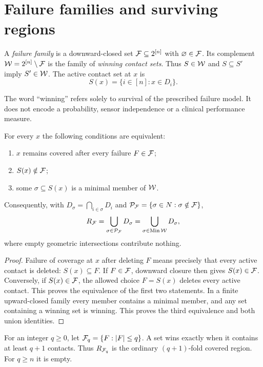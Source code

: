 \section{Failure families and surviving regions}
\label{sec:failures}
\begin{definition}
A \emph{failure family} is a downward-closed set $\mathcal F\subseteq2^{[n]}$ with $\varnothing\in\mathcal F$. Its complement $\mathcal W=2^{[n]}\setminus\mathcal F$ is the family of \emph{winning contact sets}. Thus $S\in\mathcal W$ and $S\subseteq S'$ imply $S'\in\mathcal W$. The active contact set at $x$ is
\[
S(x)=\{i\in[n]:x\in D_i\}.
\]
\end{definition}
The word ``winning'' refers solely to survival of the prescribed failure model. It does not encode a probability, sensor independence or a clinical performance measure.

\begin{proposition}\label{prop:pointwise}
For every $x$ the following conditions are equivalent:
\begin{enumerate}
\item $x$ remains covered after every failure $F\in\mathcal F$;
\item $S(x)\notin\mathcal F$;
\item some $\sigma\subseteq S(x)$ is a minimal member of $\mathcal W$.
\end{enumerate}
Consequently, with $D_\sigma=\bigcap_{i\in\sigma}D_i$ and $\mathcal P_{\mathcal F}=\{\sigma\in N:\sigma\notin\mathcal F\}$,
\begin{equation}\label{eq:region-unions}
R_{\mathcal F}=\bigcup_{\sigma\in\mathcal P_{\mathcal F}}D_\sigma
=\bigcup_{\sigma\in\operatorname{Min}\mathcal W}D_\sigma,
\end{equation}
where empty geometric intersections contribute nothing.
\end{proposition}
\begin{proof}
Failure of coverage at $x$ after deleting $F$ means precisely that every active contact is deleted: $S(x)\subseteq F$. If $F\in\mathcal F$, downward closure then gives $S(x)\in\mathcal F$. Conversely, if $S(x)\in\mathcal F$, the allowed choice $F=S(x)$ deletes every active contact. This proves the equivalence of the first two statements. In a finite upward-closed family every member contains a minimal member, and any set containing a winning set is winning. This proves the third equivalence and both union identities.
\end{proof}

\begin{example}
For an integer $q\ge0$, let $\mathcal F_q=\{F:\left|F\right|\le q\}$. A set wins exactly when it contains at least $q+1$ contacts. Thus $R_{\mathcal F_q}$ is the ordinary $(q+1)$-fold covered region. For $q\ge n$ it is empty.
\end{example}

